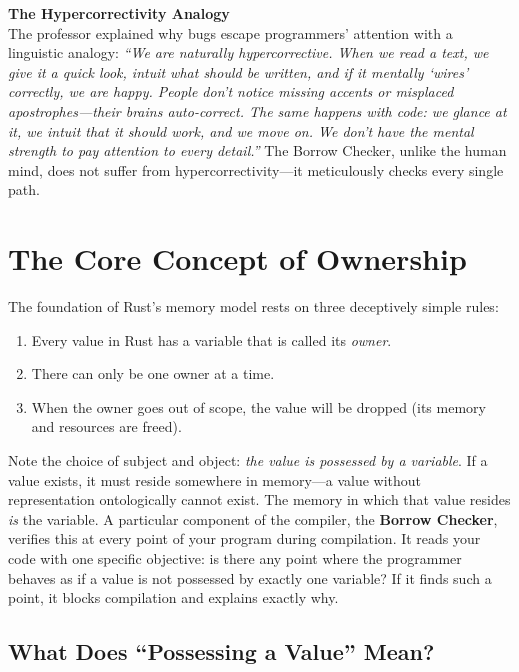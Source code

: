 \begin{insightbox}
\textbf{The Hypercorrectivity Analogy} \\
The professor explained why bugs escape programmers' attention with a linguistic analogy: \emph{``We are naturally hypercorrective. When we read a text, we give it a quick look, intuit what should be written, and if it mentally `wires' correctly, we are happy. People don't notice missing accents or misplaced apostrophes---their brains auto-correct. The same happens with code: we glance at it, we intuit that it should work, and we move on. We don't have the mental strength to pay attention to every detail.''} The Borrow Checker, unlike the human mind, does not suffer from hypercorrectivity---it meticulously checks every single path.
\end{insightbox}

\section{The Core Concept of Ownership}

The foundation of Rust's memory model rests on three deceptively simple rules:
\begin{enumerate}
    \item Every value in Rust has a variable that is called its \emph{owner}.
    \item There can only be one owner at a time.
    \item When the owner goes out of scope, the value will be dropped (its memory and resources are freed).
\end{enumerate}

Note the choice of subject and object: \emph{the value is possessed by a variable}. If a value exists, it must reside somewhere in memory---a value without representation ontologically cannot exist. The memory in which that value resides \emph{is} the variable. A particular component of the compiler, the \textbf{Borrow Checker}, verifies this at every point of your program during compilation. It reads your code with one specific objective: is there any point where the programmer behaves as if a value is not possessed by exactly one variable? If it finds such a point, it blocks compilation and explains exactly why.

\subsection{What Does ``Possessing a Value'' Mean?}

